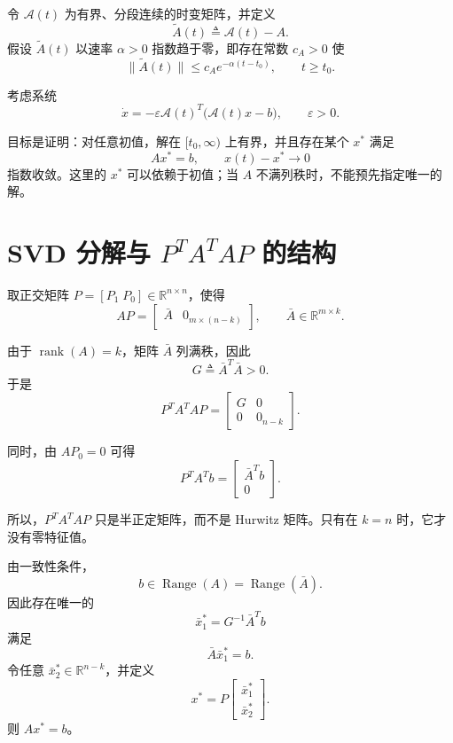 \documentclass[UTF8,fontset=fandol]{ctexart}
\newcommand{\R}{\mathbb{R}}
\newcommand{\rank}{\operatorname{rank}}
\newcommand{\Range}{\operatorname{Range}}
\begin{document}
令 $\mathcal{A}(t)$ 为有界、分段连续的时变矩阵，并定义
\[
\tilde{A}(t)\triangleq\mathcal{A}(t)-A.
\]
假设 $\tilde{A}(t)$ 以速率 $\alpha>0$ 指数趋于零，即存在常数 $c_A>0$ 使
\[
\|\tilde{A}(t)\|
\leq c_Ae^{-\alpha(t-t_0)},\qquad t\geq t_0.
\]

考虑系统
\begin{equation}
\dot{x}
=-\varepsilon\mathcal{A}(t)^{T}
\bigl(\mathcal{A}(t)x-b\bigr),
\qquad \varepsilon>0.
\tag{12}
\end{equation}

目标是证明：对任意初值，解在 $[t_0,\infty)$ 上有界，并且存在某个
$x^*$ 满足
\[
Ax^*=b,\qquad x(t)-x^*\to0
\]
指数收敛。这里的 $x^*$ 可以依赖于初值；当 $A$ 不满列秩时，不能预先指定唯一的解。

\section{SVD 分解与 $P^{T}A^{T}AP$ 的结构}

取正交矩阵 $P=[P_1\;P_0]\in\R^{n\times n}$，使得
\[
AP=
\begin{bmatrix}
\bar{A} & 0_{m\times(n-k)}
\end{bmatrix},
\qquad
\bar{A}\in\R^{m\times k}.
\]

由于 $\rank(A)=k$，矩阵 $\bar{A}$ 列满秩，因此
\[
G\triangleq\bar{A}^{T}\bar{A}>0.
\]
于是
\begin{equation}
P^{T}A^{T}AP=
\begin{bmatrix}
G&0\\
0&0_{n-k}
\end{bmatrix}.
\tag{13}
\end{equation}

同时，由 $AP_0=0$ 可得
\begin{equation}
P^{T}A^{T}b=
\begin{bmatrix}
\bar{A}^{T}b\\
0
\end{bmatrix}.
\tag{14}
\end{equation}

所以，$P^{T}A^{T}AP$ 只是半正定矩阵，而不是 Hurwitz 矩阵。只有在 $k=n$
时，它才没有零特征值。

由一致性条件，
\[
b\in\Range(A)=\Range(\bar{A}).
\]
因此存在唯一的
\[
\bar{x}_1^*=G^{-1}\bar{A}^{T}b
\]
满足
\[
\bar{A}\bar{x}_1^*=b.
\]
令任意 $\bar{x}_2^*\in\R^{n-k}$，并定义
\[
x^*=P
\begin{bmatrix}
\bar{x}_1^*\\
\bar{x}_2^*
\end{bmatrix}.
\]
则 $Ax^*=b$。
\end{document}
